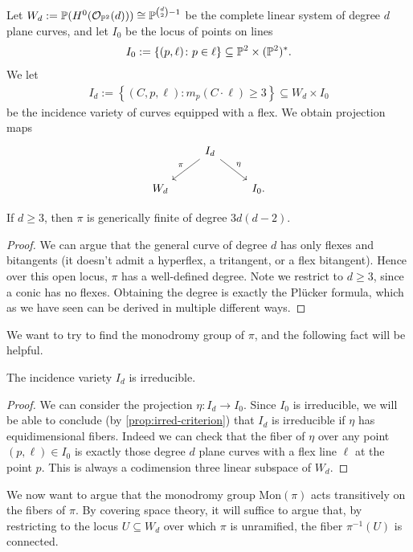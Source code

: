 \documentclass[11pt]{amsart}
\providecommand{\Mon}{\mathrm{Mon}}
\begin{document}
Let $W_d := \mathbb{P}(H^0(\O_{\P^2}(d))) \cong \P^{\binom{d}{2}-1}$ be the complete linear system of degree $d$ plane curves, and let $I_0$ be the locus of points on lines
\begin{align*}
    I_0 := \left\{ (p,\ell) \colon p\in \ell \right\} \subseteq \P^2 \times (\P^2)^\ast.
\end{align*}
We let
\begin{align*}
    I_d := \left\{ (C,p,\ell) : m_p(C\cdot \ell)\ge 3 \right\} \subseteq W_d \times I_0
\end{align*}
be the incidence variety of curves equipped with a flex. We obtain projection maps
\[ \begin{tikzcd}
     & I_d\ar[dl,"\pi" above left]\ar[dr,"\eta" above right] & \\
    W_d &  & I_0.
\end{tikzcd} \]
%
\begin{proposition} If $d \ge 3$, then $\pi$ is generically finite of degree $3d(d-2)$.
\end{proposition}
\begin{proof} We can argue that the general curve of degree $d$ has only flexes and bitangents (it doesn't admit a hyperflex, a tritangent, or a flex bitangent). Hence over this open locus, $\pi$ has a well-defined degree. Note we restrict to $d\ge 3$, since a conic has no flexes. Obtaining the degree is exactly the Pl\"{u}cker formula, which as we have seen can be derived in multiple different ways.
\end{proof}


We want to try to find the monodromy group of $\pi$, and the following fact will be helpful.

\begin{proposition}\label{prop:Id-irred-flexes}
The incidence variety $I_d$ is irreducible.
\end{proposition}
\begin{proof} We can consider the projection $\eta \colon I_d \to I_0$. Since $I_0$ is irreducible, we will be able to conclude (by \autoref{prop:irred-criterion}) that $I_d$ is irreducible if $\eta$ has equidimensional fibers. Indeed we can check that the fiber of $\eta$ over any point $(p,\ell) \in I_0$ is exactly those degree $d$ plane curves with a flex line $\ell$ at the point $p$. This is always a codimension three linear subspace of $W_d$.
\end{proof}

We now want to argue that the monodromy group $\Mon(\pi)$ acts transitively on the fibers of $\pi$. By covering space theory, it will suffice to argue that, by restricting to the locus $U \subseteq W_d$ over which $\pi$ is unramified, the fiber $\pi^{-1}(U)$ is connected.
\end{document}
